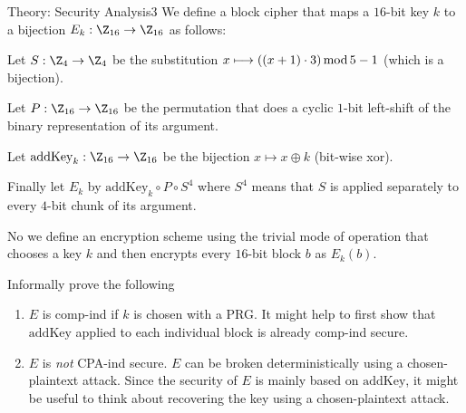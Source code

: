 \documentclass[a4paper]{article}
\begin{document}
\begin{problem}{Theory: Security Analysis}{3}
We define a block cipher that maps a $16$-bit key $k$ to a bijection $E_k:\Z_{16}\to\Z_{16}$ as follows:
\begin{compactitem}
  \item Let $S:\Z_{4}\to\Z_{4}$ be the substitution $x\longmapsto ((x+1)\cdot 3)\mathop{\mathrm{mod}} 5-1$ (which is a bijection).
  \item Let $P:\Z_{16}\to\Z_{16}$ be the permutation that does a cyclic $1$-bit left-shift of the binary representation of its argument.
  \item Let $\mathrm{addKey}_k:\Z_{16}\to\Z_{16}$ be the bijection $x\longmapsto x\oplus k$ (bit-wise xor).
  \item Finally let $E_k$ by $\mathrm{addKey}_{k}\circ P \circ S^4$ where $S^4$ means that $S$ is applied separately to every $4$-bit chunk of its argument.
\end{compactitem}

No we define an encryption scheme using the trivial mode of operation that chooses a key $k$ and then encrypts every $16$-bit block $b$ as $E_k(b)$.

Informally prove the following
\begin{enumerate}
  \item $E$ is comp-ind if $k$ is chosen with a PRG.
  It might help to first show that $\mathrm{addKey}$ applied to each individual block is already comp-ind secure.
  \item $E$ is \emph{not} CPA-ind secure.
  $E$ can be broken deterministically using a chosen-plaintext attack.
  Since the security of $E$ is mainly based on $\mathrm{addKey}$, it might be useful to think about recovering the key using a chosen-plaintext attack. 
\end{enumerate}
\end{problem}
\end{document}
